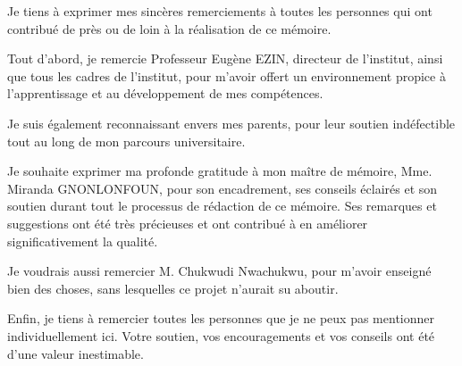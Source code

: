 \remerciements

Je tiens à exprimer mes sincères remerciements à toutes les personnes qui ont contribué de près ou de loin à la réalisation de ce mémoire. 

Tout d'abord, je remercie Professeur Eugène EZIN, directeur de l'institut, ainsi que tous les cadres de l'institut, pour m'avoir offert un environnement propice à l'apprentissage et au développement de mes compétences. 

Je suis également reconnaissant envers mes parents, pour leur soutien indéfectible tout au long de mon parcours universitaire.

Je souhaite exprimer ma profonde gratitude à mon maître de mémoire, Mme. Miranda \mbox{GNONLONFOUN}, pour son encadrement, 
ses conseils éclairés et son soutien durant tout le processus de rédaction de ce mémoire. 
Ses remarques et suggestions ont été très précieuses et ont contribué à en améliorer significativement la qualité.

Je voudrais aussi remercier M. Chukwudi Nwachukwu, pour m'avoir enseigné bien des choses, sans lesquelles ce projet n'aurait su aboutir.

Enfin, je tiens à remercier toutes les personnes que je ne peux pas mentionner individuellement ici. 
Votre soutien, vos encouragements et vos conseils ont été d'une valeur inestimable.